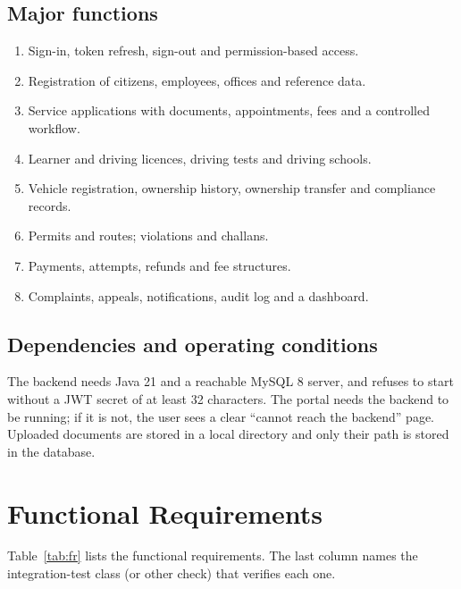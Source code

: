 \subsection{Major functions}
\begin{enumerate}
\item Sign-in, token refresh, sign-out and permission-based access.
\item Registration of citizens, employees, offices and reference data.
\item Service applications with documents, appointments, fees and a controlled workflow.
\item Learner and driving licences, driving tests and driving schools.
\item Vehicle registration, ownership history, ownership transfer and compliance records.
\item Permits and routes; violations and challans.
\item Payments, attempts, refunds and fee structures.
\item Complaints, appeals, notifications, audit log and a dashboard.
\end{enumerate}

\subsection{Dependencies and operating conditions}
The backend needs Java 21 and a reachable MySQL 8 server, and refuses to start without a
JWT secret of at least 32 characters. The portal needs the backend to be running; if
it is not, the user sees a clear ``cannot reach the backend'' page. Uploaded documents
are stored in a local directory and only their path is stored in the database.

\section{Functional Requirements}
Table~\ref{tab:fr} lists the functional requirements. The last column names the
integration-test class (or other check) that verifies each one.

